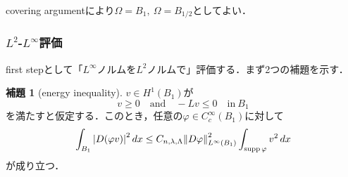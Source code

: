 \documentclass[a4paper]{ltjsarticle}
\newcommand{\Om}{\Omega}
\newcommand{\inn}{\quad\text{in}\ }
\newcommand{\1}{\mathbbm{1}}
\DeclareMathOperator{\supp}{\mathrm{supp}}
\numberwithin{equation}{section}
\theoremstyle{definition}
\newtheorem{lem}[thm]{補題}
\begin{document}
covering argumentにより$\Om=B_1,\ \Om=B_{1/2}$としてよい．
\subsubsection{\texorpdfstring{$L^2$-$L^\infty$評価}{TEXT}}
first stepとして「$L^\infty$ノルムを$L^2$ノルムで」評価する．まず2つの補題を示す．
\begin{lem}[energy inequality]\label{lem:energy_ineq}
    $v\in H^1(B_1)$が
    \begin{equation}
        v\geq0 \quad \text{and}\quad  -Lv\leq 0\inn B_1
    \end{equation}
    を満たすと仮定する．このとき，任意の$\varphi\in C^\infty_c(B_1)$に対して
    \begin{equation}
        \int_{B_1}\abs{D(\varphi v)}^2\,dx\leq C_{n,\lambda,\Lambda}\norm{D\varphi}_{L^\infty(B_1)}^2\int_{\supp \varphi}v^2\,dx 
    \end{equation}
    が成り立つ．
\end{lem}
\end{document}
